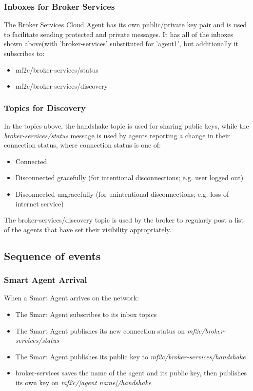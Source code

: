 \subsubsection{Inboxes for Broker Services}
The Broker Services Cloud Agent has its own public/private key pair and is used to facilitate sending protected and private messages. It has all of the inboxes shown above(with 'broker-services' substituted for 'agent1', but additionally it subscribes to:

\begin{itemize}
    \item mf2c/broker-services/status
    \item mf2c/broker-services/discovery
\end{itemize}

\subsubsection{Topics for Discovery}

In the topics above, the handshake topic is used for sharing public keys, while the \textit{broker-services/status} message is used by agents reporting a change in their connection status, where connection status is one of:
\begin{itemize}
    \item Connected
    \item Disconnected gracefully (for intentional disconnections; e.g. user logged out)
    \item Disconnected ungracefully (for unintentional disconnections; e.g. loss of internet service)
\end{itemize}

The broker-services/discovery topic is used by the broker to regularly post a list of the agents that have set their visibility appropriately.

\subsection{Sequence of events}

\subsubsection{Smart Agent Arrival}
When a Smart Agent arrives on the network:
\begin{itemize}
    \item The Smart Agent subscribes to its inbox topics
    \item The Smart Agent publishes its new connection status on \textit{mf2c/broker-services/status}
    \item The Smart Agent publishes its public key to \textit{mf2c/broker-services/handshake}
    \item broker-services saves the name of the agent and its public key, then publishes its own key on \textit{mf2c/[agent name]/handshake}
\end{itemize}

